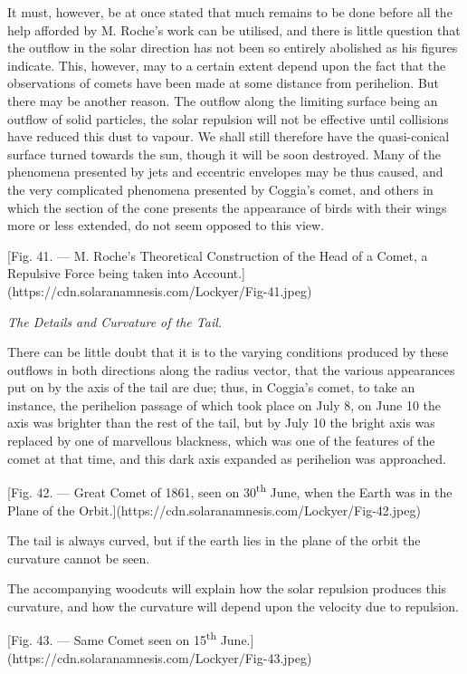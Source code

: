 \documentclass[a4paper, 12pt, oneside, polutonikogreek, english]{article}
\begin{document}
It must, however, be at once stated that much remains to be done before all the help afforded by M. Roche's work can be utilised, and there is little question that the outflow in the solar direction has not been so entirely abolished as his figures indicate. This, however, may to a certain extent depend upon the fact that the observations of comets have been made at some distance from perihelion. But there may be another reason. The outflow along the limiting surface being an outflow of solid particles, the solar repulsion will not be effective until collisions have reduced this dust to vapour. We shall still therefore have the quasi-conical surface turned towards the sun, though it will be soon destroyed. Many of the phenomena presented by jets and eccentric envelopes may be thus caused, and the very complicated phenomena presented by Coggia's comet, and others in which the section of the cone presents the appearance of birds with their wings more or less extended, do not seem opposed to this view.

[Fig. 41. --- M. Roche's Theoretical Construction of the Head of a Comet, a Repulsive Force being taken into Account.](https://cdn.solaranamnesis.com/Lockyer/Fig-41.jpeg)

\emph{The Details and Curvature of the Tail.}

There can be little doubt that it is to the varying conditions produced by these outflows in both directions along the radius vector, that the various appearances put on by the axis of the tail are due; thus, in Coggia's comet, to take an instance, the perihelion passage of which took place on July 8, on June 10 the axis was brighter than the rest of the tail, but by July 10 the bright axis was replaced by one of marvellous blackness, which was one of the features of the comet at that time, and this dark axis expanded as perihelion was approached.

[Fig. 42. --- Great Comet of 1861, seen on 30\textsuperscript{th} June, when the Earth was in the Plane of the Orbit.](https://cdn.solaranamnesis.com/Lockyer/Fig-42.jpeg)

The tail is always curved, but if the earth lies in the plane of the orbit the curvature cannot be seen.

The accompanying woodcuts will explain how the solar repulsion produces this curvature, and how the curvature will depend upon the velocity due to repulsion.

[Fig. 43. --- Same Comet seen on 15\textsuperscript{th} June.](https://cdn.solaranamnesis.com/Lockyer/Fig-43.jpeg)
\end{document}
